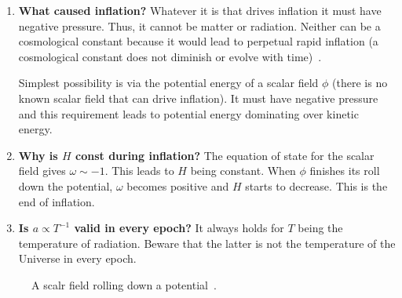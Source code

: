 \begin{mycolorbox}
  
\begin{enumerate}
      \item \textbf{What caused inflation?}
             Whatever it is that drives inflation it must have negative pressure. Thus, it cannot be matter or radiation.
             Neither can be a cosmological constant because it would lead to perpetual rapid inflation (a cosmological constant does not diminish or evolve with time)~\cite{ModernCosm}.
  
             Simplest possibility is via the potential energy of a scalar field $\phi$ (there
             is no known scalar field that can drive inflation). It must have negative pressure and this requirement leads to potential energy dominating over kinetic energy.
      \item \textbf{Why is $H$ const during inflation?} The equation of state for the scalar field gives $\omega \sim -1$. This leads to $H$ being constant. When $\phi$ finishes its roll down the potential, $\omega$ becomes positive and $H$ starts to decrease. This is the end of inflation.
      \item \textbf{Is $a \propto T^{-1}$ valid in every epoch?} It always holds for $T$ being the temperature of radiation. Beware that the latter is not the temperature of the Universe in every epoch.
  \end{enumerate}
\end{mycolorbox}
\begin{figure}[h]
      \centering
      \caption{A scalr field rolling down a potential~\cite{ModernCosm}.}
  \end{figure}
